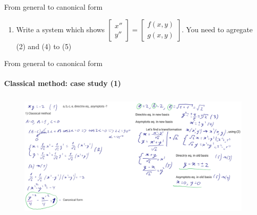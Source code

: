 \documentclass[aspectratio=169]{beamer}
\begin{document}
\begin{frame}[t]{From general to canonical form}
\begin{enumerate}
            \item Write a system which shows $\begin{bmatrix}x''\\y''\end{bmatrix} = \begin{bmatrix}f(x,y)\\g(x,y)\end{bmatrix}$. You need to agregate (2) and (4) to (5)
        \end{enumerate}
\end{frame}

\begin{frame}[t]{From general to canonical form}
\framesubtitle{Classical method: case study (1)}
    \vspace{-0.6cm}
    \begin{figure}[H]
        \centering\includegraphics[height=6cm,width=1\textwidth,keepaspectratio]{classic.png}
        \label{fig:classic.png}
    \end{figure}
\end{frame}
\end{document}
